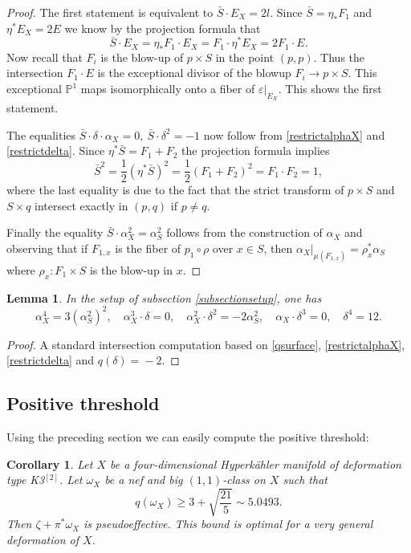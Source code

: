 \documentclass[JEP,XML,SOM,Unicode,NoEqCountersInSection,published]{cedram}
\theoremstyle{plain}
\newtheorem{corollary}[theorem]{Corollary}
\newtheorem{lemma}[theorem]{Lemma}
\theoremstyle{definition}
\newcommand{\PP}{\ensuremath{\mathbb{P}}}
\begin{document}
\begin{proof}
The first statement is equivalent to $\bar S \cdot E_X = 2l$.
Since $\bar S = \eta_* F_1$ and $\eta^* E_X = 2 E$ we know by the projection formula that
\[
\bar S \cdot E_X = \eta_* F_1 \cdot E_X = F_1 \cdot \eta^* E_X = 2 F_1 \cdot E.
\]
Now recall that $F_i$ is the blow-up of $p \times S$ in the point $(p,p)$. Thus the intersection $F_1 \cdot E$ is the
exceptional divisor of the blowup $F_i \to p \times S$. This exceptional $\PP^1$
maps isomorphically onto a fiber of $\varepsilon|_{E_X}$. This shows the first statement.

The equalities $\bar S \cdot \delta \cdot \alpha_X = 0, \ \bar S \cdot \delta^2=-1$ now follow from
\eqref{restrictalphaX} and \eqref{restrictdelta}.
Since $\eta^* \bar S = F_1 + F_2$ the projection formula implies
\[
\bar S^2 = \frac{1}{2} (\eta^* \bar S)^2 = \frac{1}{2} (F_1 + F_2)^2 = F_1 \cdot F_2 = 1,
\]
where the last equality is due to the fact that the strict transform of $p \times S$ and $S \times q$ intersect exactly
in $(p,q)$ if $p \neq q$.

Finally the equality $\bar S \cdot \alpha_X^2=\alpha_S^2$ follows from the construction of $\alpha_X$ \cite[\S 6, Prop.\,6]{Bea83} and observing that if $F_{1,x}$ is the fiber of $p_1 \circ \rho$ over $x \in S$, then
$\alpha_X|_{\mu(F_{1,x})} = \rho_x^* \alpha_S$ where $\rho_x: F_1 \times S$ is the blow-up in $x$.
\end{proof}

\begin{lemma} \label{intersectionsX}
In the setup of subsection \ref{subsectionsetup}, one has
\[
\alpha_X^4 = 3 (\alpha_S^2)^2,
\quad
\alpha_X^3 \cdot \delta = 0,
\quad
\alpha_X^2 \cdot \delta^2 = - 2 \alpha_S^2,
\quad
\alpha_X \cdot \delta^3 = 0,
\quad
\delta^4 = 12.
\]
\end{lemma}

\begin{proof}
A standard intersection computation based on \eqref{qsurface}, \eqref{restrictalphaX},
\eqref{restrictdelta} and \hbox{$q(\delta)\!=\!-2$}.
\end{proof}

\subsection{Positive threshold}

Using the preceding section we can easily compute the positive threshold:

\begin{corollary}\label{corollaryK3square}
Let $X$ be a four-dimensional Hyperkähler manifold of deformation type K3$^{[2]}$.
Let $\omega_X$ be a nef and big $(1,1)$-class on $X$ such that
\[
q(\omega_X)\geq 3+\sqrt{\frac{21}{5}}\sim 5.0493.
\]
Then $\zeta+\pi^*\omega_X$ is pseudoeffective.
This bound is optimal for a very general deformation of $X$.
\end{corollary}
\end{document}
